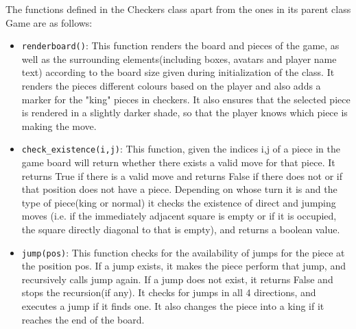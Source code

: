 \documentclass[12pt, letter]{article}
\begin{document}
The functions defined in the Checkers class apart from the ones in its parent class Game are as follows:

\begin{itemize}
    \item \texttt{renderboard()}: This function renders the board and pieces of the game, as well as the surrounding elements(including boxes, avatars and player name text) according to the board size given during initialization of the class. It renders the pieces different colours based on the player and also adds a marker for the "king" pieces in checkers. It also ensures that the selected piece is rendered in a slightly darker shade, so that the player knows which piece is making the move.
    
    \item \texttt{check\_existence(i,j)}: This function, given the indices i,j of a piece in the game board will return whether there exists a valid move for that piece. It returns True if there is a valid move and returns False if there does not or if that position does not have a piece. Depending on whose turn it is and the type of piece(king or normal) it checks the existence of direct and jumping moves (i.e. if the immediately adjacent square is empty or if it is occupied, the square directly diagonal to that is empty), and returns a boolean value.
    
    \item \texttt{jump(pos)}: This function checks for the availability of jumps for the piece at the position pos. If a jump exists, it makes the piece perform that jump, and recursively calls jump again. If a jump does not exist, it returns False and stops the recursion(if any). It checks for jumps in all 4 directions, and executes a jump if it finds one. It also changes the piece into a king if it reaches the end of the board. 
    

\end{itemize}
\end{document}
